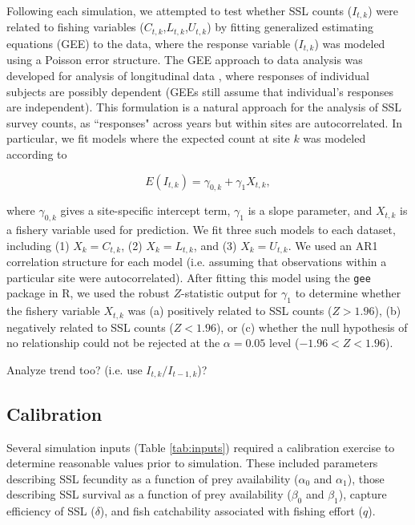 \documentclass[nonumbib,leqno]{nrc1}
\begin{document}
Following each simulation, we attempted to test whether SSL counts ($I_{t,k}$) were related to fishing variables ($C_{t,k}$,$L_{t,k}$,$U_{t,k}$) by fitting generalized estimating equations (GEE) to the data, where the response variable ($I_{t,k}$) was modeled using a Poisson error structure.  The GEE approach to data analysis was developed for analysis of longitudinal data \citep{LiangZeger1986}, where responses of individual subjects are possibly dependent (GEEs still assume that individual's responses are independent).  This formulation is a natural approach for the analysis of SSL survey counts, as ``responses" across years but within sites are autocorrelated.  In particular, we fit models where the expected count at site $k$ was modeled according to
\begin{linenomath}
  \begin{equation*}
     E(I_{t,k})=\gamma_{0,k} + \gamma_1 X_{t,k},
  \end{equation*}
\end{linenomath}
where $\gamma_{0,k}$ gives a site-specific intercept term, $\gamma_1$ is a slope parameter, and $X_{t,k}$ is a fishery variable used for prediction.  We fit three such models to each dataset, including (1) $X_k = C_{t,k}$, (2) $X_k = L_{t,k}$, and (3) $X_k=U_{t,k}$.  We used an AR1 correlation structure for each model (i.e. assuming that observations within a particular site were autocorrelated). After fitting this model using the \texttt{gee} package in R, we used the robust $Z$-statistic output for $\gamma_1$ to determine whether the fishery variable $X_{t,k}$ was (a) positively related to SSL counts ($Z>1.96$), (b) negatively related to SSL counts ($Z<1.96$), or (c) whether the null hypothesis of no relationship could not be rejected at the $\alpha=0.05$ level ($-1.96<Z<1.96$).

Analyze trend too? (i.e. use $I_{t,k}/I_{t-1,k}$)?

\subsection{Calibration}
\label{section:Calibration}

Several simulation inputs (Table \ref{tab:inputs}) required a calibration exercise to determine reasonable values prior to simulation.  These included parameters describing SSL fecundity as a function of prey availability ($\alpha_0$ and $\alpha_1$), those describing SSL survival as a function of prey availability ($\beta_0$ and $\beta_1$), capture efficiency of SSL ($\delta$), and fish catchability associated with fishing effort ($q$).
\end{document}
